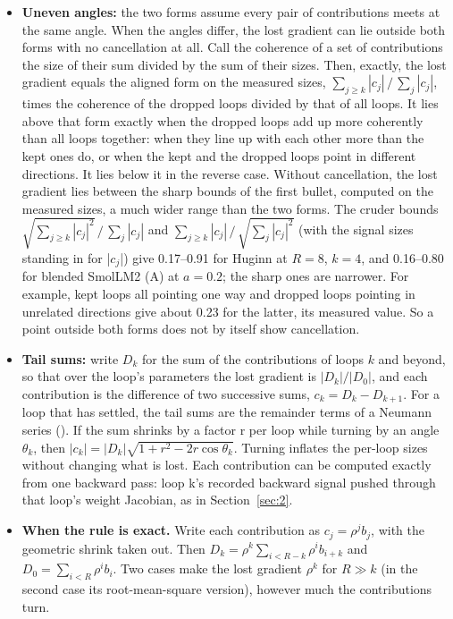 \documentclass[10pt]{article}
\begin{document}
\begin{itemize}
\item \textbf{Uneven angles:} the two forms assume every pair of contributions meets at the same angle. When the angles differ, the lost gradient can lie outside both forms with no cancellation at all. Call the coherence of a set of contributions the size of their sum divided by the sum of their sizes. Then, exactly, the lost gradient equals the aligned form on the measured sizes, $\sum_{j\geq k} |c_j| \,/\, \sum_j |c_j|$, times the coherence of the dropped loops divided by that of all loops. It lies above that form exactly when the dropped loops add up more coherently than all loops together: when they line up with each other more than the kept ones do, or when the kept and the dropped loops point in different directions. It lies below it in the reverse case. Without cancellation, the lost gradient lies between the sharp bounds of the first bullet, computed on the measured sizes, a much wider range than the two forms. The cruder bounds $\sqrt{\sum_{j\geq k} |c_j|^2} \,/\, \sum_j |c_j|$ and $\sum_{j\geq k} |c_j| \,/\, \sqrt{\sum_j |c_j|^2}$ (with the signal sizes standing in for |$c_j$|) give 0.17--0.91 for Huginn at $R = 8$, $k = 4$, and 0.16--0.80 for blended SmolLM2 (A) at $a = 0.2$; the sharp ones are narrower. For example, kept loops all pointing one way and dropped loops pointing in unrelated directions give about 0.23 for the latter, its measured value. So a point outside both forms does not by itself show cancellation.
\item \textbf{Tail sums:} write $D_k$ for the sum of the contributions of loops $k$ and beyond, so that over the loop's parameters the lost gradient is $|D_k| / |D_0|$, and each contribution is the difference of two successive sums, $c_k = D_k - D_{k+1}$. For a loop that has settled, the tail sums are the remainder terms of a Neumann series (\citealp[App., eq.~9]{liao2018}). If the sum shrinks by a factor r per loop while turning by an angle $\theta_k$, then $|c_k| = |D_k|\sqrt{1 + r^2 - 2r\cos\theta_k}$. Turning inflates the per-loop sizes without changing what is lost. Each contribution can be computed exactly from one backward pass: loop k's recorded backward signal pushed through that loop's weight Jacobian, as in Section~\ref{sec:2}.
\item \textbf{When the rule is exact.} Write each contribution as $c_j = \rho^{j} b_j$, with the geometric shrink taken out. Then $D_k = \rho^{k} \sum_{i<R-k} \rho^{i} b_{i+k}$ and $D_0 = \sum_{i<R} \rho^{i} b_i$. Two cases make the lost gradient $\rho^{k}$ for $R \gg  k$ (in the second case its root-mean-square version), however much the contributions turn.

\end{itemize}
\end{document}
